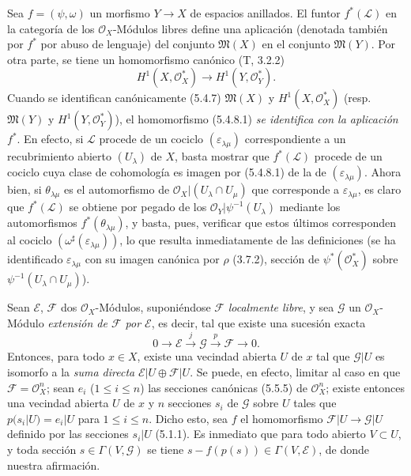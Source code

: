 \begin{env}[5.4.8]
\label{0.5.4.8-fr}
Sea $f=(\psi,\omega)$ un morfismo $Y\to X$ de espacios anillados. El funtor
$f^*(\mathcal{L})$ en la categoría de los $\mathcal{O}_X$-Módulos libres
define una aplicación (denotada también por $f^*$ por abuso de lenguaje) del conjunto
$\mathfrak{M}(X)$ en el conjunto $\mathfrak{M}(Y)$. Por otra parte, se tiene un
homomorfismo canónico (T, 3.2.2)
\[
  H^1(X,\mathcal{O}_X^*)\longrightarrow H^1(Y,\mathcal{O}_Y^*).
  \tag{5.4.8.1}\label{0.5.4.8.1-fr}
\]
Cuando se identifican canónicamente (5.4.7) $\mathfrak{M}(X)$ y
$H^1(X,\mathcal{O}_X^*)$ (resp. $\mathfrak{M}(Y)$ y
$H^1(Y,\mathcal{O}_Y^*)$), el homomorfismo (5.4.8.1) \emph{se identifica con
la aplicación $f^*$}. En efecto, si $\mathcal{L}$ procede de un cociclo
$(\varepsilon_{\lambda\mu})$ correspondiente a un recubrimiento abierto
$(U_\lambda)$ de $X$, basta mostrar que $f^*(\mathcal{L})$ procede
de un cociclo cuya clase de cohomología es imagen por (5.4.8.1) de la de
$(\varepsilon_{\lambda\mu})$. Ahora bien, si $\theta_{\lambda\mu}$ es
el automorfismo de $\mathcal{O}_X|(U_\lambda\cap U_\mu)$ que corresponde a
$\varepsilon_{\lambda\mu}$, es claro que $f^*(\mathcal{L})$ se obtiene por
pegado de los $\mathcal{O}_Y|\psi^{-1}(U_\lambda)$ mediante los
automorfismos $f^*(\theta_{\lambda\mu})$, y basta, pues, verificar que
estos últimos corresponden al cociclo
$(\omega^\sharp(\varepsilon_{\lambda\mu}))$, lo que resulta inmediatamente de las
definiciones (se ha identificado $\varepsilon_{\lambda\mu}$ con su imagen canónica
por $\rho$ (3.7.2), sección de $\psi^*(\mathcal{O}_X^*)$ sobre
$\psi^{-1}(U_\lambda\cap U_\mu)$).
\end{env}

\begin{env}[5.4.9]
\label{0.5.4.9-fr}
Sean $\mathcal{E}$, $\mathcal{F}$ dos $\mathcal{O}_X$-Módulos,
suponiéndose $\mathcal{F}$ \emph{localmente libre}, y sea $\mathcal{G}$ un
$\mathcal{O}_X$-Módulo \emph{extensión de $\mathcal{F}$ por $\mathcal{E}$},
es decir, tal que existe una sucesión exacta
\[
  0\longrightarrow\mathcal{E}\xrightarrow{j}\mathcal{G}
  \xrightarrow{p}\mathcal{F}\longrightarrow 0.
\]
Entonces, para todo $x\in X$, existe una vecindad abierta $U$ de $x$ tal que
$\mathcal{G}|U$ es isomorfo a la \emph{suma directa}
$\mathcal{E}|U\oplus\mathcal{F}|U$. Se puede, en efecto, limitar al caso en que
$\mathcal{F}=\mathcal{O}_X^n$; sean $e_i$ ($1\leq i\leq n$) las secciones
canónicas (5.5.5) de $\mathcal{O}_X^n$; existe entonces una vecindad abierta
$U$ de $x$ y $n$ secciones $s_i$ de $\mathcal{G}$ sobre $U$ tales que
$p(s_i|U)=e_i|U$ para $1\leq i\leq n$. Dicho esto, sea $f$
el homomorfismo $\mathcal{F}|U\to\mathcal{G}|U$ definido por las secciones
$s_i|U$ (5.1.1). Es inmediato que para todo abierto $V\subset U$, y toda
sección $s\in\Gamma(V,\mathcal{G})$ se tiene
$s-f(p(s))\in\Gamma(V,\mathcal{E})$, de donde nuestra afirmación.
\end{env}


